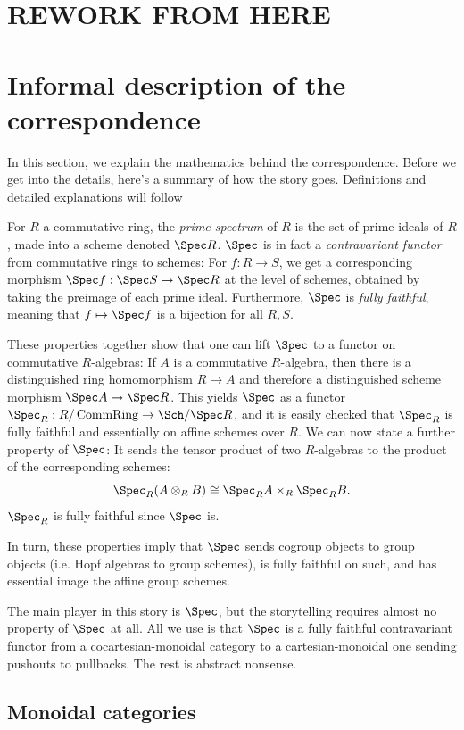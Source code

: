 \documentclass{article}
\DeclareMathOperator{\CommRing}{CommRing}
\begin{document}
\section{REWORK FROM HERE}


\section{Informal description of the correspondence}\label{sec:informal}


In this section, we explain the mathematics behind the correspondence.
Before we get into the details, here's a summary of how the story goes.
Definitions and detailed explanations will follow

For $R$ a commutative ring, the \emph{prime spectrum} of $R$ is the set of prime ideals of $R$,
made into a scheme denoted $\Spec R$.
$\Spec$ is in fact a \emph{contravariant functor} from commutative rings to schemes:
For $f : R \to S$, we get a corresponding morphism $\Spec f : \Spec S \to \Spec R$
at the level of schemes, obtained by taking the preimage of each prime ideal.
Furthermore, $\Spec$ is \emph{fully faithful},
meaning that $f \mapsto \Spec f$ is a bijection for all $R, S$.

These properties together show that one can lift $\Spec$ to a functor on commutative $R$-algebras:
If $A$ is a commutative $R$-algebra, then there is a distinguished ring homomorphism $R \to A$
and therefore a distinguished scheme morphism $\Spec A \to \Spec R$.
This yields $\Spec$ as a functor $\Spec_R : R / \CommRing \to \Sch / \Spec R$,
and it is easily checked that $\Spec_R$ is fully faithful and essentially on affine schemes over $R$.
We can now state a further property of $\Spec$:
It sends the tensor product of two $R$-algebras to the product of the corresponding schemes:
\[
\Spec_R (A \otimes_R B) \cong \Spec_R A \times_R \Spec_R B.
\]
$\Spec_R$ is fully faithful since $\Spec$ is.

In turn, these properties imply that $\Spec$ sends cogroup objects to group objects
(i.e. Hopf algebras to group schemes), is fully faithful on such,
and has essential image the affine group schemes.

The main player in this story is $\Spec$,
but the storytelling requires almost no property of $\Spec$ at all.
All we use is that $\Spec$ is a fully faithful contravariant functor
from a cocartesian-monoidal category to a cartesian-monoidal one sending pushouts to pullbacks.
The rest is abstract nonsense.


\subsection{Monoidal categories}
\end{document}
